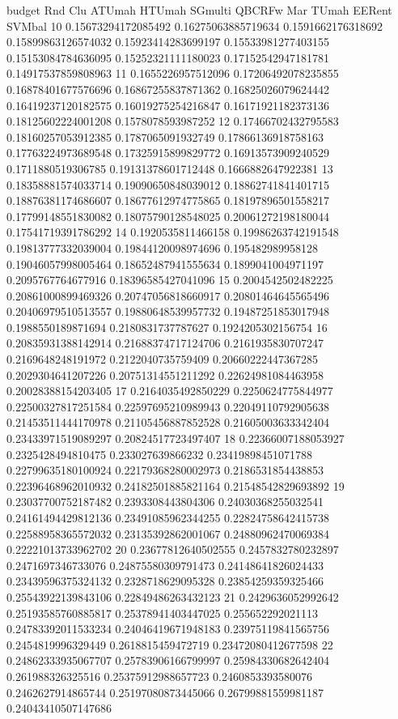 budget Rnd Clu ATUmah HTUmah SGmulti QBCRFw Mar TUmah EERent SVMbal
10 0.15673294172085492 0.16275063885719634 0.1591662176318692 0.15899863126574032 0.15923414283699197 0.15533981277403155 0.15153084784636095 0.15252321111180023 0.17152542947181781 0.14917537859808963
11 0.1655226957512096 0.17206492078235855 0.16878401677576696 0.16867255837871362 0.16825026079624442 0.16419237120182575 0.16019275254216847 0.16171921182373136 0.18125602224001208 0.1578078593987252
12 0.17466702432795583 0.18160257053912385 0.1787065091932749 0.17866136918758163 0.17763224973689548 0.17325915899829772 0.16913573909240529 0.1711880519306785 0.19131378601712448 0.1666882647922381
13 0.18358881574033714 0.19090650848039012 0.18862741841401715 0.18876381174686607 0.18677612974775865 0.18197896501558217 0.17799148551830082 0.18075790128548025 0.20061272198180044 0.17541719391786292
14 0.1920535811466158 0.19986263742191548 0.19813777332039004 0.19844120098974696 0.195482989958128 0.19046057998005464 0.18652487941555634 0.1899041004971197 0.2095767764677916 0.18396585427041096
15 0.2004542502482225 0.20861000899469326 0.20747056818660917 0.20801464645565496 0.20406979510513557 0.19880648539957732 0.19487251853017948 0.1988550189871694 0.2180831737787627 0.1924205302156754
16 0.20835931388142914 0.21688374717124706 0.2161935830707247 0.2169648248191972 0.2122040735759409 0.20660222447367285 0.2029304641207226 0.20751314551211292 0.22624981084463958 0.20028388154203405
17 0.2164035492850229 0.2250624775844977 0.22500327817251584 0.22597695210989943 0.22049110792905638 0.21453511444170978 0.21105456887852528 0.21605003633342404 0.23433971519089297 0.20824517723497407
18 0.22366007188053927 0.2325428494810475 0.233027639866232 0.23419898451071788 0.22799635180100924 0.22179368280002973 0.2186531854438853 0.22396468962010932 0.24182501885821164 0.21548542829693892
19 0.23037700752187482 0.2393308443804306 0.24030368255032541 0.24161494429812136 0.23491085962344255 0.22824758642415738 0.22588958365572032 0.23135392862001067 0.24880962470069384 0.22221013733962702
20 0.23677812640502555 0.2457832780232897 0.2471697346733076 0.24875580309791473 0.24148641826024433 0.23439596375324132 0.2328718629095328 0.23854259359325466 0.25543922139843106 0.22849486263432123
21 0.2429636052992642 0.25193585760885817 0.25378941403447025 0.255652292021113 0.24783392011533234 0.24046419671948183 0.23975119841565756 0.2454819996329449 0.2618815459472719 0.23472080412677598
22 0.24862333935067707 0.25783906166799997 0.25984330682642404 0.261988326325516 0.25375912988657723 0.2460853393580076 0.2462627914865744 0.25197080873445066 0.26799881559981187 0.24043410507147686

